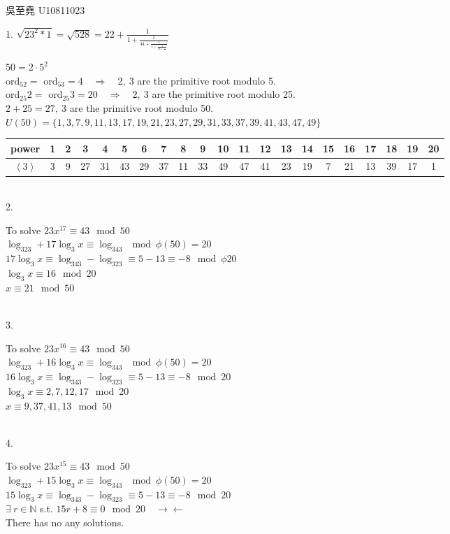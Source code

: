 \documentclass[12pt]{book}
\author{andersonwu2000}
\begin{document}
\begin{CJK}{UTF8}{bsmi}

\hfill 吳至堯 U10811023

1. $\displaystyle \sqrt{23^2*1}=\sqrt{528}=22+\frac{1}{\displaystyle1+\frac{1}{44+\frac{1}{1+\frac{1}{44+\frac{1}{...}}}}}$

$50=2\cdot5^2$ \\
ord$_52=$ ord$_53=4\quad\Rightarrow\quad 2,\ 3$ are the primitive root modulo 5. \\
ord$_{25}2=$ ord$_{25}3=20\quad\Rightarrow\quad 2,\ 3$ are the primitive root modulo 25. \\
$2+25=27,\ 3$ are the primitive root modulo 50. \\

$U(50)=\{1,3,7,9,11,13,17,19,21,23,27,29,31,33,37,39,41,43,47,49\}$ \\

\begin{tabular}{c|c|c|c|c|c|c|c|c|c|c|c|c|c|c|c|c|c|c|c|c}
    power & 1 & 2 & 3 & 4 & 5 & 6 & 7 & 8 & 9 & 10 & 11 & 12 & 13 & 14 & 15 & 16 & 17 & 18 & 19 & 20 \\\hline
    $\left \langle 3 \right \rangle$ & 3 & 9 & 27 & 31 & 43 & 29 & 37 & 11 & 33 & 49 & 47 & 41 & 23 & 19 & 7 & 21 & 13 & 39 & 17 & 1
\end{tabular} \\

2. \begin{minipage}[t]{\dimexpr\linewidth-2em}
To solve $23x^{17}\equiv43\mod50$ \\
$\log_323+17\log_3x\equiv\log_343\mod\phi(50)=20$ \\
$17\log_3x\equiv\log_343-\log_323\equiv5-13\equiv-8\mod\phi20$ \\
$\log_3x\equiv16\mod20$ \\
$x\equiv21\mod50$
\end{minipage} \\

3. \begin{minipage}[t]{\dimexpr\linewidth-2em}
To solve $23x^{16}\equiv43\mod50$ \\
$\log_323+16\log_3x\equiv\log_343\mod\phi(50)=20$ \\
$16\log_3x\equiv\log_343-\log_323\equiv5-13\equiv-8\mod20$ \\
$\log_3x\equiv2, 7, 12, 17\mod20$ \\
$x\equiv9, 37, 41, 13\mod50$
\end{minipage} \\

4. \begin{minipage}[t]{\dimexpr\linewidth-2em}
To solve $23x^{15}\equiv43\mod50$ \\
$\log_323+15\log_3x\equiv\log_343\mod\phi(50)=20$ \\
$15\log_3x\equiv\log_343-\log_323\equiv5-13\equiv-8\mod20$ \\
$\exists\ r\in\mathbb{N}$ s.t. $15r+8\equiv0\mod20\quad\rightarrow\leftarrow$ \\
There has no any solutions.
\end{minipage}

\end{CJK}
\end{document}
